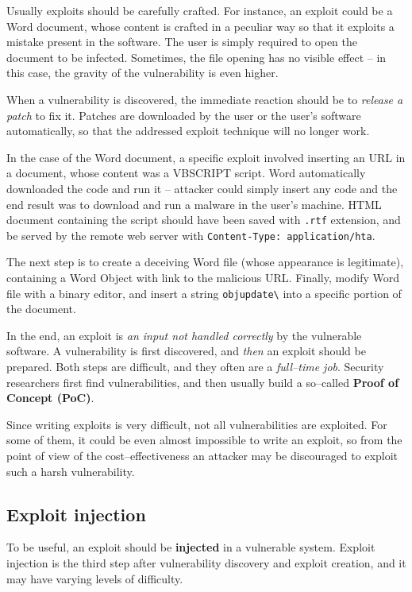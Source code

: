 \documentclass[10pt]{extbook}
\begin{document}
Usually exploits should be carefully crafted. For instance, an exploit could be
a Word document, whose content is crafted in a peculiar way so that it exploits
a mistake present in the software. The user is simply required to open the
document to be infected. Sometimes, the file opening has no visible effect --
in this case, the gravity of the vulnerability is even higher.

When a vulnerability is discovered, the immediate reaction should be to
\emph{release a patch} to fix it. Patches are downloaded by the user or the
user's software automatically, so that the addressed exploit technique will no
longer work.

In the case of the Word document, a specific exploit involved inserting an URL
in a document, whose content was a VBSCRIPT script. Word automatically
downloaded the code and run it -- attacker could simply insert any code and the
end result was to download and run a malware in the user's machine. HTML document
containing the script should have been saved with \texttt{.rtf} extension, and
be served by the remote web server with \texttt{Content-Type: application/hta}.

The next step is to create a deceiving Word file (whose appearance is
legitimate), containing a Word Object with link to the malicious URL. Finally,
modify Word file with a binary editor, and insert a string
\texttt{objupdate\textbackslash} into a specific portion of the document.

In the end, an exploit is \emph{an input not handled correctly} by the
vulnerable software. A vulnerability is first discovered, and \emph{then} an
exploit should be prepared. Both steps are difficult, and they often are a
\emph{full--time job}. Security researchers first find vulnerabilities, and
then usually build a so--called \textbf{Proof of Concept (PoC)}.

Since writing exploits is very difficult, not all vulnerabilities are
exploited. For some of them, it could be even almost impossible to write an
exploit, so from the point of view of the cost--effectiveness an attacker may
be discouraged to exploit such a harsh vulnerability.

\subsection{Exploit injection}

To be useful, an exploit should be \textbf{injected} in a vulnerable system.
Exploit injection is the third step after vulnerability discovery and exploit
creation, and it may have varying levels of difficulty.
\end{document}
